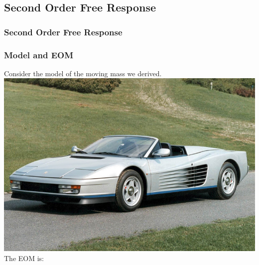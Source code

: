 \documentclass[fleqn]{beamer} %
\newcommand{\sectionIsubsectionItitle}{Second Order Free Response}
\begin{document}
		\subsection{\sectionIsubsectionItitle}\label{sectionIsubsectionI}


			\begin{frame}
				\frametitle{\sectionIsubsectionItitle}
				\bigskip

				\frametitle{Model and EOM}

				Consider the model of the moving mass we derived. \vspace{3mm}\\

				\includegraphics[scale=.15]{images/ferrari.jpg} \vspace{3mm}\\

				\large The EOM is:\vspace{3mm}\\

				 \vspace{3mm}\\

				\btVFill
			\end{frame}
\end{document}
